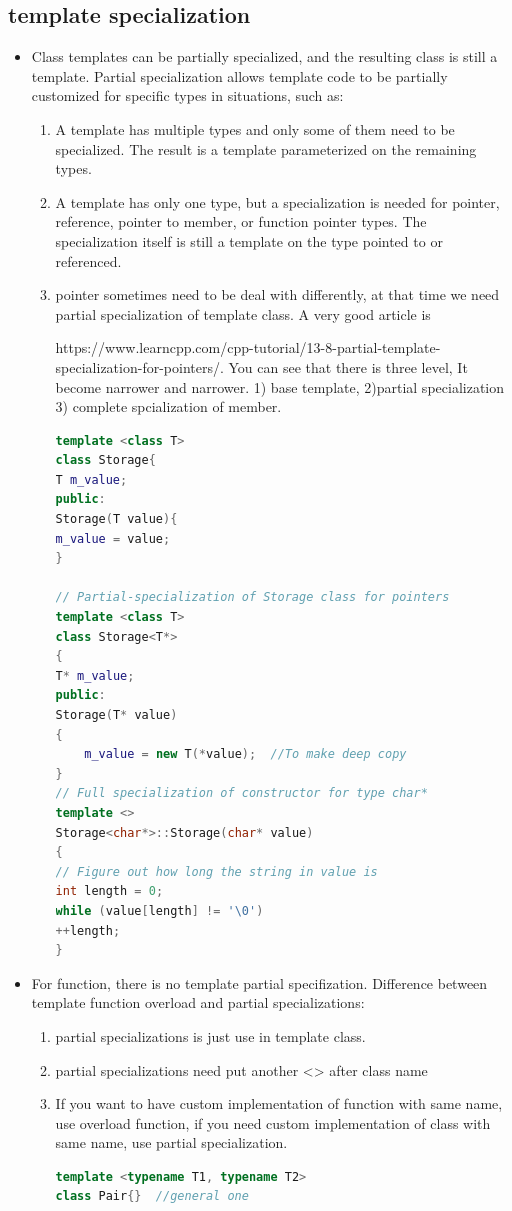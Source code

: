 \documentclass[a4paper,12pt,twoside]{book}
\begin{document}
\subsection{template specialization}
\begin{itemize}
\item Class templates can be partially specialized, and the resulting class is still a template. Partial specialization allows template code to be partially customized for specific types in situations, such as:

\begin{enumerate}
\item A template has multiple types and only some of them need to be specialized. The result is a template parameterized on the remaining types.

\item A template has only one type, but a specialization is needed for pointer, reference, pointer to member, or function pointer types. The specialization itself is still a template on the type pointed to or referenced.

\item pointer sometimes need to be deal with differently, at that time we need partial specialization of template class. A very good article is

https://www.learncpp.com/cpp-tutorial/13-8-partial-template-specialization-for-pointers/. 
You can see that there is three level, It become narrower and narrower. 1) base template, 2)partial specialization 3) complete spcialization of member.
\begin{lstlisting}[frame=single, language=c++]
template <class T>
class Storage{
T m_value;
public:
Storage(T value){
m_value = value;
}

// Partial-specialization of Storage class for pointers
template <class T>
class Storage<T*>
{
T* m_value;
public:
Storage(T* value)
{
	m_value = new T(*value);  //To make deep copy
}
// Full specialization of constructor for type char*
template <>
Storage<char*>::Storage(char* value)
{
// Figure out how long the string in value is
int length = 0;
while (value[length] != '\0')
++length;
}
\end{lstlisting}

\end{enumerate}

\item For function, there is no template partial specifization. Difference between template function overload and partial specializations:
\begin{enumerate}
\item partial specializations is just use in template class.
\item partial specializations need put another <> after class name
\item If you want to have custom implementation of function with same name, use overload function, if you need  custom implementation of class with same name, use partial specialization.
\begin{lstlisting}[frame=single, language=c++]
template <typename T1, typename T2>
class Pair{}  //general one


\end{lstlisting}
\end{enumerate}
\end{itemize}
\end{document}
